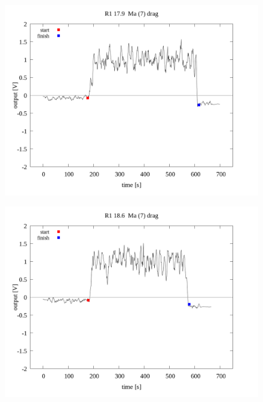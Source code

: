 \documentclass[a4paper]{jsarticle}
\begin{document}
\begin{figure}[htbp]
    \footnotesize
    \begin{center}
        \includegraphics[width=140mm]{../../../../33_result/210806/moving_average/7/drag/02/R1_17.9_ma(7)_drag_02.png}
    \end{center}
\end{figure}

\begin{figure}[htbp]
    \footnotesize
    \begin{center}
        \includegraphics[width=140mm]{../../../../33_result/210806/moving_average/7/drag/02/R1_18.6_ma(7)_drag_02.png}
    \end{center}
\end{figure}
\end{document}
